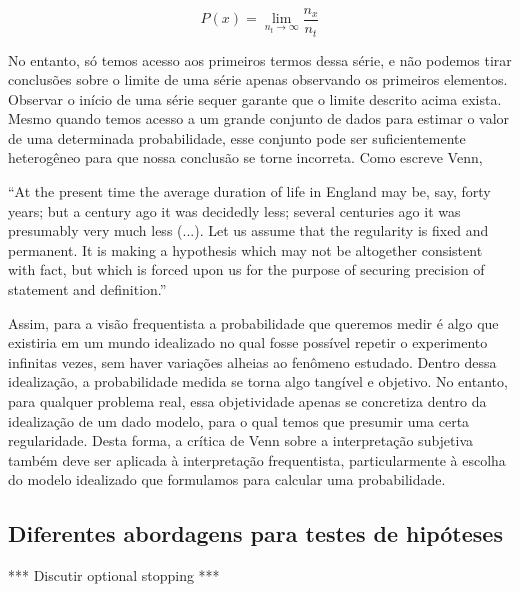 \documentclass[12pt,a4paper]{article}
\begin{document}
\begin{equation}
	P(x) = \lim_{n_t \rightarrow \infty} \frac{n_x}{n_t} 
\end{equation}

No entanto, só temos acesso aos primeiros termos dessa série, e não podemos tirar conclusões sobre o limite de uma série apenas
observando os primeiros elementos. Observar o início de uma série sequer garante que o limite descrito acima exista.
Mesmo quando temos acesso a um grande conjunto de dados para estimar o valor de uma determinada
probabilidade, esse conjunto pode ser suficientemente heterogêneo para que nossa conclusão se torne incorreta. Como escreve Venn,

``At the present time the average duration of life in England may be, say, forty years; but a century ago it was decidedly less;
several centuries ago it was presumably very much less (...). Let us assume that the regularity is fixed and permanent. It is
making a hypothesis which may not be altogether consistent with fact, but which is forced upon us for the purpose of securing
precision of statement and definition.''\cite{Venn1866}

Assim, para a visão frequentista a probabilidade que queremos medir é algo que existiria em um mundo idealizado no qual fosse
possível repetir o experimento infinitas vezes, sem haver variações alheias ao fenômeno estudado. Dentro dessa idealização,
a probabilidade medida se torna algo tangível e objetivo. No entanto, para qualquer problema real, essa objetividade
apenas se concretiza dentro da idealização de um dado modelo, para o qual temos que presumir uma certa regularidade. Desta
forma, a crítica de Venn sobre a interpretação subjetiva também deve ser aplicada à interpretação frequentista, particularmente
à escolha do modelo idealizado que formulamos para calcular uma probabilidade.

\subsection{Diferentes abordagens para testes de hipóteses}

*** Discutir optional stopping ***
\end{document}
